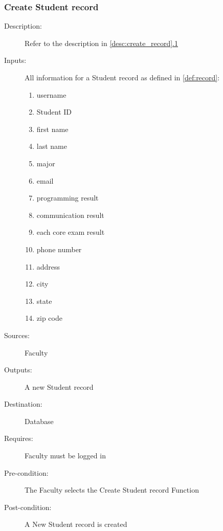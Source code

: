 \subsubsection{\large Create Student record} 
\begin{boxed} %
\begin{description}
\item[Description:]
   Refer to the description in \autoref{desc:create_record}\hyperref[desc:create_record]{.1}
\item[Inputs:]
   All information for a Student record as defined in \autoref{def:record}:
   \begin{enumerate}
      \item username
      \item Student ID
      \item first name
      \item last name
      \item major
      \item email
      \item programming result
      \item communication result
      \item each core exam result
      \item phone number
      \item address
      \item city
      \item state
      \item zip code
   \end{enumerate}
\item[Sources:]
   Faculty
\item[Outputs:]
   A new Student record
\item[Destination:]
   Database
\item[Requires:]
   Faculty must be logged in
\item[Pre-condition:]
   The Faculty selects the Create Student record Function
\item[Post-condition:]
   A New Student record is created
\end{description}
\end{boxed} %

